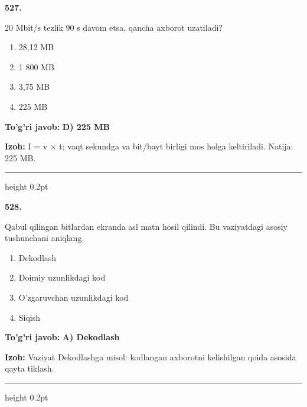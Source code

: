 \documentclass[10pt,a4paper,oneside]{article}
\begin{document}
\noindent\textbf{\color{ink}527.}
\par
20 Mbit/s tezlik 90 s davom etsa, qancha axborot uzatiladi?
\begin{enumerate}[label=\Alph*),leftmargin=9mm]
\item 28,12 MB
\item 1 800 MB
\item 3,75 MB
\item 225 MB
\end{enumerate}
\begin{tcolorbox}[enhanced,breakable,colback=teal!4,colframe=teal!50!black,boxrule=0.5pt,arc=1.1mm,left=3mm,right=3mm,top=1.7mm,bottom=1.7mm,before skip=2mm,after skip=2mm]
\textbf{\color{teal}To'g'ri javob:} \textbf{D) 225 MB}
\par\smallskip
\textbf{Izoh:} I = v \ensuremath{\times} t; vaqt sekundga va bit/bayt birligi mos holga keltiriladi. Natija: 225 MB.
\end{tcolorbox}
\vspace{2mm}\hrule height 0.2pt \vspace{3mm}

\noindent\textbf{\color{ink}528.}
\par
Qabul qilingan bitlardan ekranda asl matn hosil qilindi. Bu vaziyatdagi asosiy tushunchani aniqlang.
\begin{enumerate}[label=\Alph*),leftmargin=9mm]
\item Dekodlash
\item Doimiy uzunlikdagi kod
\item O'zgaruvchan uzunlikdagi kod
\item Siqish
\end{enumerate}
\begin{tcolorbox}[enhanced,breakable,colback=teal!4,colframe=teal!50!black,boxrule=0.5pt,arc=1.1mm,left=3mm,right=3mm,top=1.7mm,bottom=1.7mm,before skip=2mm,after skip=2mm]
\textbf{\color{teal}To'g'ri javob:} \textbf{A) Dekodlash}
\par\smallskip
\textbf{Izoh:} Vaziyat Dekodlashga misol: kodlangan axborotni kelishilgan qoida asosida qayta tiklash.
\end{tcolorbox}
\vspace{2mm}\hrule height 0.2pt \vspace{3mm}
\end{document}
